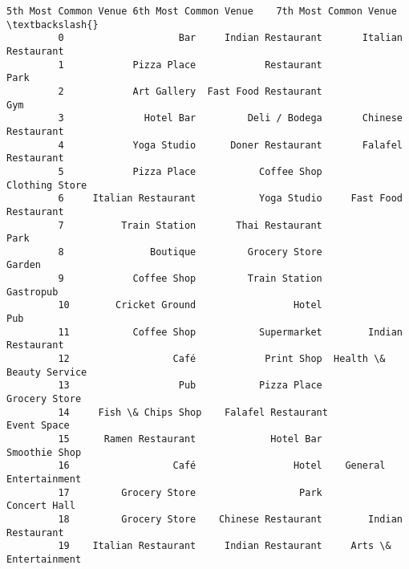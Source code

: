 \documentclass[11pt]{article}
\begin{document}
\begin{Verbatim}[commandchars=\\\{\}]
            5th Most Common Venue 6th Most Common Venue    7th Most Common Venue  \textbackslash{}
         0                    Bar     Indian Restaurant       Italian Restaurant   
         1            Pizza Place            Restaurant                     Park   
         2            Art Gallery  Fast Food Restaurant                      Gym   
         3              Hotel Bar         Deli / Bodega       Chinese Restaurant   
         4            Yoga Studio      Doner Restaurant       Falafel Restaurant   
         5            Pizza Place           Coffee Shop           Clothing Store   
         6     Italian Restaurant           Yoga Studio     Fast Food Restaurant   
         7          Train Station       Thai Restaurant                     Park   
         8               Boutique         Grocery Store                   Garden   
         9            Coffee Shop         Train Station                Gastropub   
         10        Cricket Ground                 Hotel                      Pub   
         11           Coffee Shop           Supermarket        Indian Restaurant   
         12                  Café            Print Shop  Health \& Beauty Service   
         13                   Pub           Pizza Place            Grocery Store   
         14     Fish \& Chips Shop    Falafel Restaurant              Event Space   
         15      Ramen Restaurant             Hotel Bar            Smoothie Shop   
         16                  Café                 Hotel    General Entertainment   
         17         Grocery Store                  Park             Concert Hall   
         18         Grocery Store    Chinese Restaurant        Indian Restaurant   
         19    Italian Restaurant     Indian Restaurant     Arts \& Entertainment   
         

\end{Verbatim}
\end{document}
